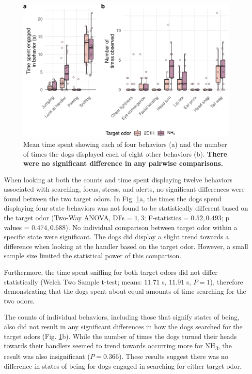 \documentclass[
]{article}
\begin{document}
\begin{figure}
\centering
\includegraphics{main-manuscript_files/figure-latex/indiv-behavior-times-1.pdf}
\caption{\label{fig:indiv-behavior-times}Mean time spent showing each of four behaviors (a) and the number of times the dogs displayed each of eight other behaviors (b). \textbf{There were no significant difference in any pairwise comparisons.}}
\end{figure}

When looking at both the counts and time spent displaying twelve behaviors associated with searching, focus, stress, and alerts, no significant differences were found between the two target odors. In Fig. \ref{fig:indiv-behavior-times}a, the times the dogs spend displaying four state behaviors was not found to be statistically different based on the target odor (Two-Way ANOVA, DFs = \(1, 3\); F-statistics = \(0.52, 0.493\); p values = \(0.474, 0.688\)). No individual comparison between target odor within a specific state were significant. The dogs did display a slight trend towards a difference when looking at the handler based on the target odor. However, a small sample size limited the statistical power of this comparison.

Furthermore, the time spent sniffing for both target odors did not differ statistically (Welch Two Sample t-test; means: \(11.71\) s, \(11.91\) s, \(P = 1\)), therefore demonstrating that the dogs spent about equal amounts of time searching for the two odors.

The counts of individual behaviors, including those that signify states of being, also did not result in any significant differences in how the dogs searched for the target odors (Fig. \ref{fig:indiv-behavior-times}b). While the number of times the dogs turned their heads towards their handlers seemed to trend towards occurring more for NH\textsubscript{3}, the result was also insignificant (\(P = 0.366\)). These results suggest there was no difference in states of being for dogs engaged in searching for either target odor.
\end{document}
